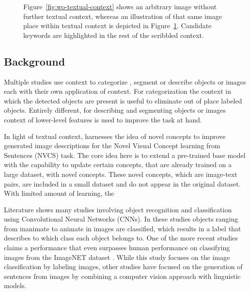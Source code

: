 \begin{figure}[h!]
\begin{subfigure}[b]{0.4\textwidth}
\begin{tikzpicture}
		\end{tikzpicture}
		\caption{}
		\label{fig:w-textual-context}
	\end{subfigure}
\caption{Figure~\ref{fig:wo-textual-context} shows an arbitrary image without further textual context, whereas an illustration of that same image place within textual context is depicted in Figure~\ref{fig:w-textual-context}. Candidate keywords are highlighted in the rest of the scribbled context.}
\label{fig:textual-context}
\end{figure}



\subsection{Background}
Multiple studies use context to categorize \cite{Rabinovich2007, carbonetto2004statistical}, segment \cite{Sande2011} or describe \cite{mao2015learning} objects or images each with their own application of context. For categorization the context in which the detected objects are present is useful to eliminate out of place labeled objects. Entirely different, for describing and segmenting objects or images context of lower-level features is used to improve the task at hand.

In light of textual context, \cite{mao2015learning} harnesses the idea of novel concepts to improve generated image descriptions for the Novel Visual Concept 	learning from Sentences (NVCS) task. The core idea here is to extend a pre-trained base model with the capability to update certain concepts, that are already trained on a large dataset, with novel concepts. These novel concepts, which are image-text pairs, are included in a small dataset and do not appear in the original dataset. With limited amount of learning, the 

Literature shows many studies involving object recognition and classification \cite{carbonetto2004statistical, he2015delving} using Convolutional Neural Networks (CNNs). In these studies objects ranging from inanimate to animate in images are classified, which results in a label that describes to which class each object belongs to. One of the more recent studies \cite{he2015delving} claims a performance that even surpasses human performance on classifying images from the ImageNET dataset \cite{russakovsky2014imagenet}. While this study focuses on the image classification by labeling images, other studies \cite{mao2014explain, mitchell2012midge, Yang2011, Farhadi2010} have focused on the generation of sentences from images by combining a computer vision approach with linguistic models. 

